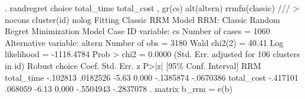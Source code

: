 . randregret choice total_time total_cost , gr(cs) alt(altern) rrmfn(classic) ///
> nocons cluster(id)  nolog
Fitting Classic RRM Model 
{\smallskip}
RRM: Classic Random Regret Minimization Model
{\smallskip}
Case ID variable: cs                           Number of cases    =       1060
Alternative variable: altern                   Number of obs      =       3180
                                               Wald chi2(2)       =      40.41
Log likelihood = -1118.4784                    Prob > chi2        =     0.0000
                                 (Std. Err. adjusted for   106 clusters in id)
             {\VBAR}               Robust
      choice {\VBAR}      Coef.   Std. Err.      z    P>|z|     [95\% Conf. Interval]
RRM          {\VBAR}
  total_time {\VBAR}   -.102813   .0182526    -5.63   0.000    -.1385874   -.0670386
  total_cost {\VBAR}   -.417101    .068059    -6.13   0.000    -.5504943   -.2837078
{\smallskip}
. matrix b_rrm = e(b)
{\smallskip}
